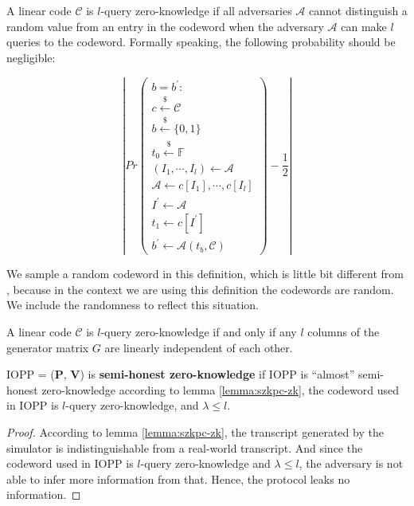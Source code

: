 \begin{definition}
A linear code $\mathcal{C}$ is $l$-query zero-knowledge if all adversaries $\mathcal{A}$ cannot distinguish a random value from an entry in the codeword when the adversary $\mathcal{A}$ can make $l$ queries to the codeword. Formally speaking, the following probability should be negligible:


$$
\left \lvert
Pr
\begin{pmatrix}
 b = b^\prime : \\
 c \overset{{\scriptscriptstyle\$}}{\leftarrow} \mathcal{C} \\
 b \overset{{\scriptscriptstyle\$}}{\leftarrow} \{0, 1\} \\
 t_0 \overset{{\scriptscriptstyle\$}}{\leftarrow} \mathbb{F} \\
 (I_1, \cdots, I_l) \leftarrow \mathcal{A} \\
 \mathcal{A} \leftarrow c[I_1], \cdots, c[I_l] \\
 I^\prime \leftarrow \mathcal{A} \\
 t_1 \leftarrow c[I^\prime] \\
 b^\prime \leftarrow \mathcal{A}(t_b, \mathcal{C})
\end{pmatrix}
- \frac{1}{2}
\right \rvert
$$
\end{definition}

We sample a random codeword in this definition, which is little bit different from \cite{BCL22}, because in the context we are using this definition the codewords are random. We include the randomness to reflect this situation.

\begin{lemma}
\label{lemma:lquery-zk}

A linear code $\mathcal{C}$ is $l$-query zero-knowledge if and only if any $l$ columns of the generator matrix $G$ are linearly independent of each other.

\end{lemma}

\begin{lemma}
\label{lemma:szkpc-zk-final}

IOPP = ($\textbf{P}$, $\textbf{V}$) is \textbf{semi-honest zero-knowledge} if IOPP is ``almost'' semi-honest zero-knowledge according to lemma \ref{lemma:szkpc-zk}, the codeword used in IOPP is $l$-query zero-knowledge, and $\lambda \le l$.

\end{lemma}
\begin{proof}

According to lemma \ref{lemma:szkpc-zk}, the transcript generated by the simulator is indistinguishable from a real-world transcript. And since the codeword used in IOPP is $l$-query zero-knowledge and $\lambda \le l$, the adversary is not able to infer more information from that. Hence, the protocol leaks no information.

\end{proof}

